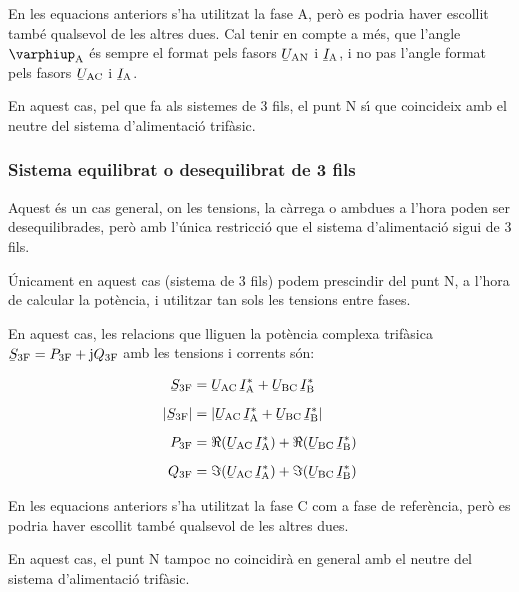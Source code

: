 En les equacions anteriors s'ha utilitzat la fase A, per\`{o} es
podria haver escollit tamb\'{e} qualsevol de les altres dues. Cal tenir
en compte a m\'{e}s, que l'angle $\varphiup\ped{A}$ \'{e}s sempre el format
pels fasors $\cmplx{U}\ped{AN}$ i $\cmplx{I}\ped{A}$, i no pas
l'angle format pels fasors $\cmplx{U}\ped{AC}$ i
$\cmplx{I}\ped{A}$.

En aquest cas, pel que fa als sistemes de 3 fils,  el punt N s\'{\i}
que coincideix amb el neutre del sistema d'alimentaci\'{o} trif\`{a}sic.

\subsubsection{Sistema equilibrat o desequilibrat de 3 fils}

Aquest \'{e}s un cas  general, on les tensions, la c\`{a}rrega o ambdues a
l'hora  poden ser desequilibrades, per\`{o} amb l'\'{u}nica restricci\'{o} que
el sistema d'alimentaci\'{o} sigui de 3 fils.

 \'{U}nicament en aquest cas (sistema de 3 fils) podem prescindir del punt N, a l'hora de
calcular la pot\`{e}ncia, i utilitzar tan sols les tensions entre fases.

En aquest cas, les relacions que lliguen la pot\`{e}ncia complexa
trif\`{a}sica $\cmplx{S}\ped{3F} = P\ped{3F} + \ju Q\ped{3F}$ amb les
tensions i corrents s\'{o}n:

\begin{align}
    \cmplx{S}\ped{3F} &= \cmplx{U}\ped{AC} \,\cmplx{I}\ped{A}^*
     +  \cmplx{U}\ped{BC} \,\cmplx{I}\ped{B}^*  \label{eq:s_3f_3fils}\\[2mm]
    |\cmplx{S}\ped{3F}| &= |\cmplx{U}\ped{AC}\, \cmplx{I}\ped{A}^* +
    \cmplx{U}\ped{BC}\, \cmplx{I}\ped{B}^*| \\[2mm]
    P\ped{3F} &= \Re(\cmplx{U}\ped{AC}\, \cmplx{I}\ped{A}^*) +
    \Re(\cmplx{U}\ped{BC}\, \cmplx{I}\ped{B}^*) \\[2mm]
    Q\ped{3F} &= \Im(\cmplx{U}\ped{AC} \,\cmplx{I}\ped{A}^*) +
    \Im(\cmplx{U}\ped{BC} \,\cmplx{I}\ped{B}^*)
\end{align}

En les equacions anteriors s'ha utilitzat la fase C com a
fase de refer\`{e}ncia, per\`{o} es podria haver escollit tamb\'{e} qualsevol de
les altres dues.

En aquest cas, el punt N tampoc no coincidir\`{a} en general amb
el neutre del sistema d'alimentaci\'{o} trif\`{a}sic.

